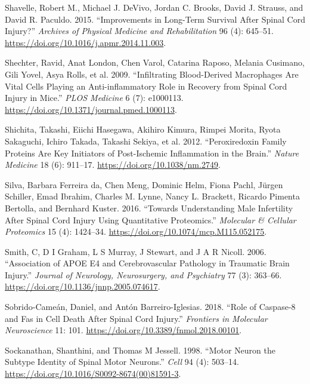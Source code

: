 \documentclass[9pt,lineno]{elife}
\newlength{\cslhangindent}
\newlength{\cslentryspacingunit} %
\newenvironment{CSLReferences}[2] %
 {%
  \setlength{\parindent}{0pt}
  \ifodd #1
  \let\oldpar\par
  \def\par{\hangindent=\cslhangindent\oldpar}
  \fi
  \setlength{\parskip}{#2\cslentryspacingunit}
 }%
 {}
\begin{document}
\begin{CSLReferences}{1}{0}
\leavevmode{}%
Shavelle, Robert M., Michael J. DeVivo, Jordan C. Brooks, David J. Strauss, and David R. Paculdo. 2015. {``Improvements in {Long-Term Survival After Spinal Cord Injury}?''} \emph{Archives of Physical Medicine and Rehabilitation} 96 (4): 645--51. \url{https://doi.org/10.1016/j.apmr.2014.11.003}.

\leavevmode{}%
Shechter, Ravid, Anat London, Chen Varol, Catarina Raposo, Melania Cusimano, Gili Yovel, Asya Rolls, et al. 2009. {``Infiltrating {Blood-Derived Macrophages Are Vital Cells Playing} an {Anti-inflammatory Role} in {Recovery} from {Spinal Cord Injury} in {Mice}.''} \emph{PLOS Medicine} 6 (7): e1000113. \url{https://doi.org/10.1371/journal.pmed.1000113}.

\leavevmode{}%
Shichita, Takashi, Eiichi Hasegawa, Akihiro Kimura, Rimpei Morita, Ryota Sakaguchi, Ichiro Takada, Takashi Sekiya, et al. 2012. {``Peroxiredoxin Family Proteins Are Key Initiators of Post-Ischemic Inflammation in the Brain.''} \emph{Nature Medicine} 18 (6): 911--17. \url{https://doi.org/10.1038/nm.2749}.

\leavevmode{}%
Silva, Barbara Ferreira da, Chen Meng, Dominic Helm, Fiona Pachl, Jürgen Schiller, Emad Ibrahim, Charles M. Lynne, Nancy L. Brackett, Ricardo Pimenta Bertolla, and Bernhard Kuster. 2016. {``Towards {Understanding Male Infertility After Spinal Cord Injury Using Quantitative Proteomics}.''} \emph{Molecular \& Cellular Proteomics} 15 (4): 1424--34. \url{https://doi.org/10.1074/mcp.M115.052175}.

\leavevmode{}%
Smith, C, D I Graham, L S Murray, J Stewart, and J A R Nicoll. 2006. {``Association of {APOE} E4 and Cerebrovascular Pathology in Traumatic Brain Injury.''} \emph{Journal of Neurology, Neurosurgery, and Psychiatry} 77 (3): 363--66. \url{https://doi.org/10.1136/jnnp.2005.074617}.

\leavevmode{}%
Sobrido-Cameán, Daniel, and Antón Barreiro-Iglesias. 2018. {``Role of {Caspase-8} and {Fas} in {Cell Death After Spinal Cord Injury}.''} \emph{Frontiers in Molecular Neuroscience} 11: 101. \url{https://doi.org/10.3389/fnmol.2018.00101}.

\leavevmode{}%
Sockanathan, Shanthini, and Thomas M Jessell. 1998. {``Motor {Neuron} the {Subtype Identity} of {Spinal Motor Neurons}.''} \emph{Cell} 94 (4): 503--14. \url{https://doi.org/10.1016/S0092-8674(00)81591-3}.


\end{CSLReferences}
\end{document}
